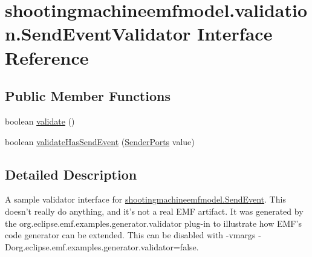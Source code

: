 \hypertarget{interfaceshootingmachineemfmodel_1_1validation_1_1_send_event_validator}{\section{shootingmachineemfmodel.\-validation.\-Send\-Event\-Validator Interface Reference}
\label{interfaceshootingmachineemfmodel_1_1validation_1_1_send_event_validator}
}
\subsection*{Public Member Functions}
\begin{DoxyCompactItemize}
\item 
boolean \hyperlink{interfaceshootingmachineemfmodel_1_1validation_1_1_send_event_validator_aaf1b2c989a7bc90deb6b9e28cdc09163}{validate} ()
\item 
boolean \hyperlink{interfaceshootingmachineemfmodel_1_1validation_1_1_send_event_validator_a7648632c46518714acdb1b87a841a6c7}{validate\-Has\-Send\-Event} (\hyperlink{interfaceshootingmachineemfmodel_1_1_sender_ports}{Sender\-Ports} value)
\end{DoxyCompactItemize}


\subsection{Detailed Description}
A sample validator interface for \hyperlink{interfaceshootingmachineemfmodel_1_1_send_event}{shootingmachineemfmodel.\-Send\-Event}. This doesn't really do anything, and it's not a real E\-M\-F artifact. It was generated by the org.\-eclipse.\-emf.\-examples.\-generator.\-validator plug-\/in to illustrate how E\-M\-F's code generator can be extended. This can be disabled with -\/vmargs -\/\-Dorg.\-eclipse.\-emf.\-examples.\-generator.\-validator=false. 

